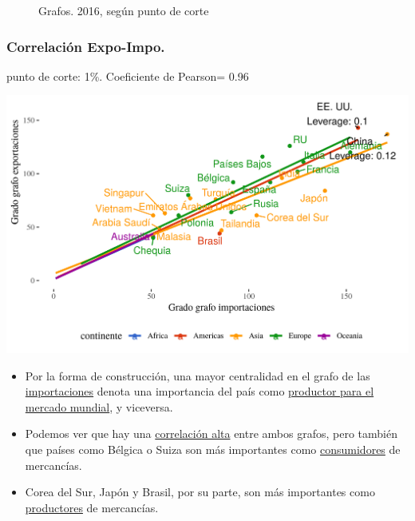 \documentclass[compress]{beamer}
\begin{document}
\begin{frame}
\begin{figure}
		\caption{Grafos. 2016, según punto de corte}
		\label{fig:grafo_2016}
	\end{figure}
	
\end{frame}



\begin{frame}


\frametitle{Correlación Expo-Impo.}

punto de corte: 1\%.
Coeficiente de Pearson= 0.96

\includegraphics[width=\linewidth]{Graficos/corr_grados_2016_1_pcnt}

\end{frame}

\begin{frame}

\begin{itemize}
	\item[\faRebel] Por la forma de construcción, una mayor centralidad en el grafo de las \underline{importaciones} denota una importancia del país como \underline{productor para el mercado mundial}, y viceversa.
	\item[\faRebel] Podemos ver que hay una \underline{correlación alta} entre ambos grafos, pero también que países como Bélgica o Suiza son más importantes como \underline{consumidores} de mercancías.
	\item[\faRebel] Corea del Sur, Japón y Brasil, por su parte, son más importantes como \underline{productores} de mercancías. 
\end{itemize}
\end{frame}
\end{document}
